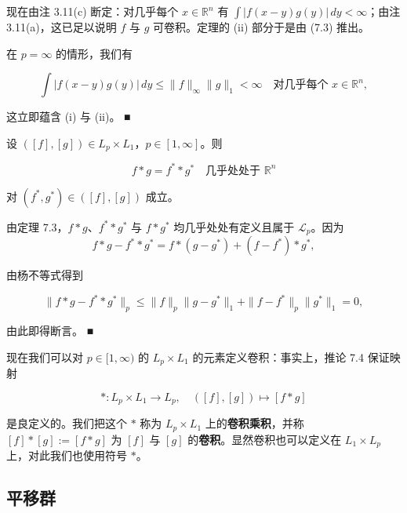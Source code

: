 \begin{theorem}
\begin{items}
现在由注 3.11(c) 断定：对几乎每个 $ x \in \mathbb{R}^{n} $ 有 $ \int |f(x-y)g(y)|\,dy < \infty $；由注 3.11(a)，这已足以说明 $ f $ 与 $ g $ 可卷积。定理的 (ii) 部分于是由 (7.3) 推出。

\item

在 $ p = \infty $ 的情形，我们有

\[
\int |f(x-y)g(y)|\,dy \le \|f\|_{\infty}\|g\|_{1} < \infty \quad \text{对几乎每个 } x \in \mathbb{R}^{n} ,
\]

这立即蕴含 (i) 与 (ii)。 \nobreak\hspace{0.35em}■

\end{items}

\end{theorem}

\begin{corollary}

设 $ ([f],[g]) \in L_{p} \times L_{1} $，$ p \in [1,\infty] $。则

\[
f * g = f^{*} * g^{*} \quad \text{几乎处处于 } \mathbb{R}^{n}
\]

对 $ (f^{*},g^{*}) \in ([f],[g]) $ 成立。

\proofhead
由定理 7.3，$ f * g $、$ f^{*} * g^{*} $ 与 $ f * g^{*} $ 均几乎处处有定义且属于 $ \mathcal{L}_{p} $。因为
\[
f * g - f^{*} * g^{*} = f * (g - g^{*}) + (f - f^{*}) * g^{*} ,
\]

由杨不等式得到

\[
\|f * g - f^{*} * g^{*}\|_{p} \le \|f\|_{p}\|g - g^{*}\|_{1} + \|f - f^{*}\|_{p}\|g^{*}\|_{1} = 0 ,
\]

由此即得断言。 \nobreak\hspace{0.35em}■

\end{corollary}

现在我们可以对 $ p \in [1,\infty) $ 的 $ L_{p} \times L_{1} $ 的元素定义卷积：事实上，推论 7.4 保证映射

\[
* : L_{p} \times L_{1} \to L_{p} , \quad ([f],[g]) \mapsto [f * g]
\]

是良定义的。我们把这个 $ * $ 称为 $ L_{p} \times L_{1} $ 上的\textbf{卷积乘积}，并称 $ [f] * [g] := [f * g] $ 为 $ [f] $ 与 $ [g] $ 的\textbf{卷积}。显然卷积也可以定义在 $ L_{1} \times L_{p} $ 上，对此我们也使用符号 $ * $。

\subsection*{平移群}

